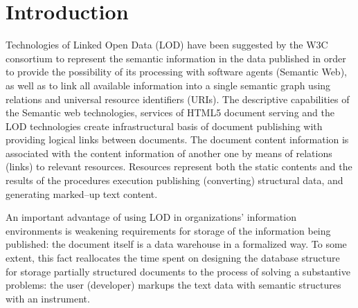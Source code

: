 \documentclass[conference,a4paper]{IEEEtran}
\begin{document}
\section{Introduction}






Technologies of Linked Open Data (LOD) \cite{b1} have been suggested by
the W3C consortium to represent the semantic information in the data
published in order to provide the possibility of its processing with
software agents (Semantic Web), as well as to link all available
information into a single semantic graph using relations and universal
resource identifiers (URIs). The descriptive capabilities of the
Semantic web technologies, services of HTML5 document serving and the
LOD technologies create infrastructural basis of document publishing
with providing logical links between documents. The document content
information is associated with the content information of another one by
means of relations (links) to relevant resources. Resources represent
both the static contents and the results of the procedures execution
publishing (converting) structural data, and generating marked--up text
content.

An important advantage of using LOD in organizations' information
environments is weakening requirements for storage of the information
being published: the document itself is a data warehouse in a formalized
way. To some extent, this fact reallocates the time spent on designing
the database structure for storage partially structured documents to the
process of solving a substantive problems: the user (developer) markups
the text data with semantic structures with an instrument.
\end{document}
